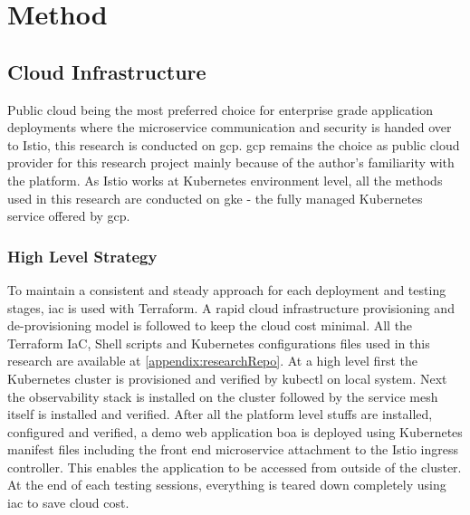 \section{Method}


\subsection{Cloud Infrastructure}
Public cloud being the most preferred choice for enterprise grade application deployments where the microservice communication and security 
is handed over to Istio, this research is conducted on \acrlong{gcp}. \acrshort{gcp} remains the choice as public cloud provider for this 
research project mainly because of the author's familiarity with the platform. As Istio works at Kubernetes environment level, all the 
methods used in this research are conducted on \acrlong{gke} - the fully managed Kubernetes service offered by \acrshort{gcp}.

\subsubsection{High Level Strategy}
To maintain a consistent and steady approach for each deployment and testing stages, \acrfull{iac} is used with Terraform. A rapid cloud infrastructure provisioning and de-provisioning model is followed to keep the cloud cost minimal. All the Terraform IaC, Shell scripts and Kubernetes configurations files used in this research are available at \ref{appendix:researchRepo}. At a high level first the Kubernetes cluster is provisioned and verified by kubectl on local system. Next the observability stack is installed on the cluster followed by the service mesh itself is installed and verified. After all the platform level stuffs are installed, configured and verified, a demo web application \acrfull{boa} is deployed using Kubernetes manifest files including the front end microservice attachment to the Istio ingress controller. This enables the application to be accessed from outside of the cluster. At the end of each testing sessions, everything is teared down completely using \acrshort{iac} to save cloud cost.

